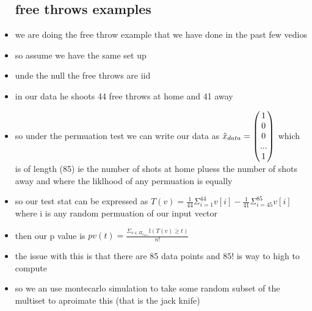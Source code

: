 \documentclass{article}
\begin{document}
\begin{itemize}
\subsection{free throws examples}
\item we are doing the free throw example that we have done in the past few vedios
\item so assume we have the same set up
\item unde the null the free throws are iid 
\item in our data he shoots 44 free throws at home and 41 away
\item so under the permuation test we can write our data as $\Tilde{x}_{data}=\begin{pmatrix}
   1\\0\\0\\...\\1 
\end{pmatrix}$ which is of length (85) ie the number of shots at home pluess the number of shots away and where the liklhood of any permuation is equally
\item so our test stat can be expressed as $T(v)=\frac{1}{44}\Sigma_{i=1}^{44}v[i]-\frac{1}{41}\Sigma_{i=45}^{85}v[i]$ where i is any random permuation of our input vector 
\item then our p value is $pv(t)=\frac{\Sigma_{v\in \Pi_{x_{data}}}\mathbb{I}(T(v)\geq t)}{n!}$

\item the issue with this is that there are 85 data points and $85!$ is way to high to compute 
\item so we an use montecarlo simulation to take some random subset of the multiset to aproimate this (that is the jack knife)

\end{itemize}
\end{document}
